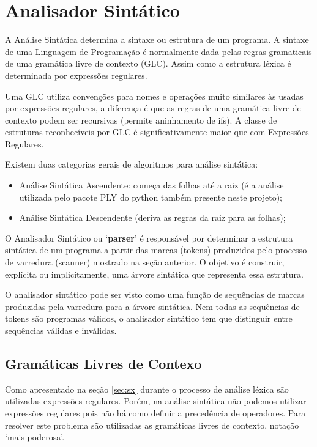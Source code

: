 \documentclass[12pt]{article}
\begin{document}
\section{Analisador Sintático}  
A Análise Sintática determina a sintaxe ou estrutura de um
programa. A sintaxe de uma Linguagem de Programação é normalmente dada pelas regras gramaticais de uma gramática livre de contexto (GLC). Assim como a estrutura léxica é determinada por expressões regulares. 

Uma GLC utiliza convenções para nomes e operações muito similares
às usadas por expressões regulares, a diferença é que as regras de uma gramática livre de contexto podem ser recursivas (permite aninhamento de ifs). A classe de estruturas reconhecíveis por GLC é significativamente maior
que com Expressões Regulares. 

Existem duas categorias gerais de algoritmos para análise sintática: 
\begin{itemize}
	\item Análise Sintática Ascendente:  
	começa das folhas até a raiz (é a análise utilizada pelo pacote PLY do python também presente neste projeto); 
	\item Análise Sintática Descendente (deriva as regras da raiz para as folhas);
\end{itemize}
O Analisador Sintático ou `\textbf{parser}' é responsável por
determinar a estrutura sintática de um programa a partir das marcas (tokens) produzidos pelo processo de varredura (scanner) mostrado na seção anterior. O objetivo é
construir, explícita ou implicitamente, uma árvore sintática que representa essa estrutura. 

O analisador sintático pode ser visto como uma função de sequências
de marcas produzidas pela varredura para a árvore sintática. Nem todas as sequências de tokens são programas válidos, o analisador sintático tem que distinguir entre sequências válidas e
inválidas. 
  
\subsection{Gramáticas Livres de Contexo} 
Como apresentado na seção \ref{sec:sx} durante o processo de análise léxica são utilizadas expressões regulares. Porém, na análise sintática não podemos utilizar expressões regulares pois não há como definir a precedência de operadores. Para resolver este problema são utilizadas as gramáticas livres de contexto, notação `mais poderosa'. 
\end{document}
